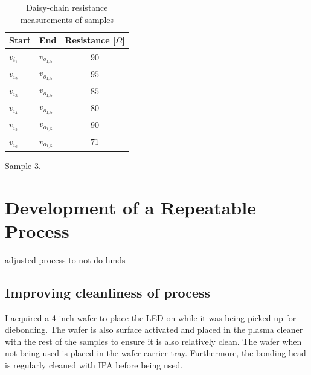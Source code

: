 \begin{table}
\begin{subtable}[t]{0.3\textwidth}
\begin{tabular}{| l | l | c |}
            \hline
            Start & End & Resistance [$\Omega$] \\
            \hline
            \hline
            $v_{i_1}$ & $v_{o_{1,5}}$ & $90$ \\
            $v_{i_2}$ & $v_{o_{1,5}}$ & $95$ \\
            $v_{i_3}$ & $v_{o_{1,5}}$ & $85$ \\
            $v_{i_4}$ & $v_{o_{1,5}}$ & $80$ \\
            $v_{i_5}$ & $v_{o_{1,5}}$ & $90$ \\
            $v_{i_6}$ & $v_{o_{1,5}}$ & $71$ \\
            \hline
        \end{tabular}
        \caption{Sample 3.}
    \end{subtable}
    \caption{Daisy-chain resistance measurements of samples}
    \label{tab:daisychain_resistance_table}
\end{table}





\section{Development of a Repeatable Process}

adjusted process to not do hmds


\subsection{Improving cleanliness of process}

I acquired a 4-inch wafer to place the LED on while it was being picked up for diebonding. The wafer is also surface activated and placed in the plasma cleaner with the rest of the samples to ensure it is also relatively clean. The wafer when not being used is placed in the wafer carrier tray. Furthermore, the bonding head is regularly cleaned with IPA before being used.
